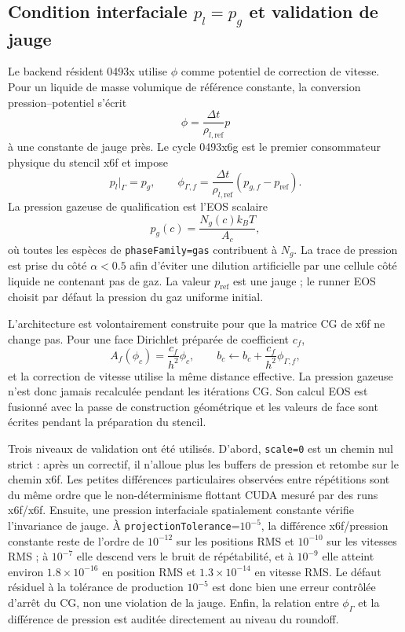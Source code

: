 \documentclass[11pt,a4paper]{article}
\begin{document}
\subsection{Condition interfaciale \texorpdfstring{$p_l=p_g$}{pl=pg} et validation de jauge}

Le backend résident 0493x utilise $\phi$ comme potentiel de correction de vitesse. Pour un liquide de masse volumique de référence constante, la conversion pression--potentiel s'écrit
\begin{equation}
  \phi=\frac{\Delta t}{\rho_{l,\mathrm{ref}}}p
\end{equation}
à une constante de jauge près. Le cycle 0493x6g est le premier consommateur physique du stencil x6f et impose
\begin{equation}
  p_l|_\Gamma=p_g,
  \qquad
  \phi_{\Gamma,f}=\frac{\Delta t}{\rho_{l,\mathrm{ref}}}
  \left(p_{g,f}-p_{\mathrm{ref}}\right).
\end{equation}
La pression gazeuse de qualification est l'EOS scalaire
\begin{equation}
  p_g(c)=\frac{N_g(c)k_BT}{A_c},
\end{equation}
où toutes les espèces de \texttt{phaseFamily=gas} contribuent à $N_g$. La trace de pression est prise du côté $\alpha<0.5$ afin d'éviter une dilution artificielle par une cellule côté liquide ne contenant pas de gaz. La valeur $p_{\mathrm{ref}}$ est une jauge ; le runner EOS choisit par défaut la pression du gaz uniforme initial.

L'architecture est volontairement construite pour que la matrice CG de x6f ne change pas. Pour une face Dirichlet préparée de coefficient $c_f$,
\begin{equation}
  A_f(\phi_c)=\frac{c_f}{h^2}\phi_c,
  \qquad
  b_c\leftarrow b_c+\frac{c_f}{h^2}\phi_{\Gamma,f},
\end{equation}
et la correction de vitesse utilise la même distance effective. La pression gazeuse n'est donc jamais recalculée pendant les itérations CG. Son calcul EOS est fusionné avec la passe de construction géométrique et les valeurs de face sont écrites pendant la préparation du stencil.

Trois niveaux de validation ont été utilisés. D'abord, \texttt{scale=0} est un chemin nul strict : après un correctif, il n'alloue plus les buffers de pression et retombe sur le chemin x6f. Les petites différences particulaires observées entre répétitions sont du même ordre que le non-déterminisme flottant CUDA mesuré par des runs x6f/x6f. Ensuite, une pression interfaciale spatialement constante vérifie l'invariance de jauge. À \texttt{projectionTolerance}=$10^{-5}$, la différence x6f/pression constante reste de l'ordre de $10^{-12}$ sur les positions RMS et $10^{-10}$ sur les vitesses RMS ; à $10^{-7}$ elle descend vers le bruit de répétabilité, et à $10^{-9}$ elle atteint environ $1.8\times10^{-16}$ en position RMS et $1.3\times10^{-14}$ en vitesse RMS. Le défaut résiduel à la tolérance de production $10^{-5}$ est donc bien une erreur contrôlée d'arrêt du CG, non une violation de la jauge. Enfin, la relation entre $\phi_\Gamma$ et la différence de pression est auditée directement au niveau du roundoff.
\end{document}
